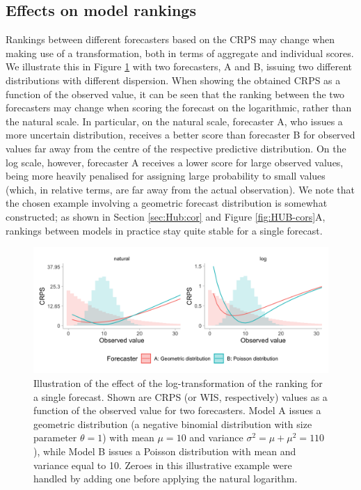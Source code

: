 \documentclass{article}
\begin{document}
\subsection{Effects on model rankings}
\label{sec:methods:rankings}
Rankings between different forecasters based on the CRPS may change when making use of a transformation, both in terms of aggregate and individual scores. We illustrate this in Figure \ref{fig:illustration-ranking} with two forecasters, A and B, issuing two different distributions with different dispersion. When showing the obtained CRPS as a function of the observed value, it can be seen that the ranking between the two forecasters may change when scoring the forecast on the logarithmic, rather than the natural scale. In particular, on the natural scale, forecaster A, who issues a more uncertain distribution, receives a better score than forecaster B for observed values far away from the centre of the respective predictive distribution. On the log scale, however, forecaster A receives a lower score for large observed values, being more heavily penalised for assigning large probability to small values (which, in relative terms, are far away from the actual observation). We note that the chosen example involving a geometric forecast distribution is somewhat constructed; as shown in Section \ref{sec:Hub:cor} and Figure \ref{fig:HUB-cors}A, rankings between models in practice stay quite stable for a single forecast. 


\begin{figure}[h!]
\centering
\includegraphics[width = 1\textwidth]{output/figures/illustration-effect-log-ranking-crps.png}
\caption{Illustration of the effect of the log-transformation of the ranking for a single forecast. Shown are CRPS (or WIS, respectively) values as a function of the observed value for two forecasters. Model A issues a geometric distribution (a negative binomial distribution with size parameter $\theta = 1$) with mean $\mu = 10$ and variance $\sigma^2 = \mu + \mu^2 = 110$), while Model B issues a Poisson distribution with mean and variance equal to 10. Zeroes in this illustrative example were handled by adding one before applying the natural logarithm.}
\label{fig:illustration-ranking}
\end{figure}
\end{document}

